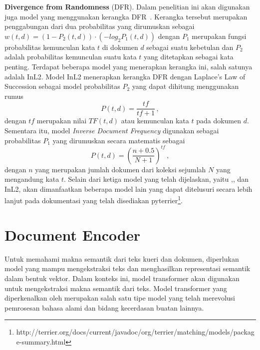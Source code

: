 \vspace{2mm}
\noindent\textbf{Divergence from Randomness} (DFR). Dalam penelitian ini akan digunakan juga model yang menggunakan kerangka DFR~\citep{amati2002probabilistic}. Kerangka tersebut merupakan penggabungan dari dua probabilitas yang dirumuskan sebagai $w(t,d)=(1-P_2(t,d))\cdot(-log_2 P_1(t,d))$ dengan $P_1$ merupakan fungsi probabilitas kemunculan kata $t$ di dokumen $d$ sebagai suatu kebetulan dan $P_2$ adalah probabilitas kemunculan suatu kata $t$ yang ditetapkan sebagai kata penting. Terdapat beberapa model yang menerapkan kerangka ini, salah satunya adalah InL2. Model InL2 menerapkan kerangka DFR dengan Laplace's Law of Succession sebagai model probabilitas $P_2$ yang dapat dihitung menggunakan rumus
\[
P(t,d)=\frac{tf}{tf+1} \, ,
\]
dengan $tf$ merupakan nilai $TF(t,d)$ atau kemunculan kata $t$ pada dokumen $d$. Sementara itu, model \textit{Inverse Document Frequency} digunakan sebagai probabilitas $P_1$ yang dirumuskan secara matematis sebagai
\[
P(t,d)=\left(\frac{n+0.5}{N+1}\right)^{tf} \, ,
\]
dengan $n$ yang merupakan jumlah dokumen dari koleksi sejumlah $N$ yang mengandung kata $t$. Selain dari ketiga model yang telah dijelaskan, yaitu \obm{},\tfidf{}, dan InL2, akan dimanfaatkan beberapa model lain yang dapat ditelusuri secara lebih lanjut pada dokumentasi yang telah disediakan pyterrier\footnote{http://terrier.org/docs/current/javadoc/org/terrier/matching/models/package-summary.html}.





\section{Document Encoder}
\label{subbab:2:Document Encoder}
Untuk memahami makna semantik dari teks kueri dan dokumen, diperlukan model yang mampu mengekstraksi teks dan menghasilkan representasi semantik dalam bentuk vektor. Dalam konteks ini, model transformer akan digunakan untuk mengekstraksi makna semantik dari teks. Model transformer yang diperkenalkan oleh \citet{vaswani2017attention} merupakan salah satu tipe model \nn{} yang telah merevolusi pemrosesan bahasa alami dan bidang kecerdasan buatan lainnya.

